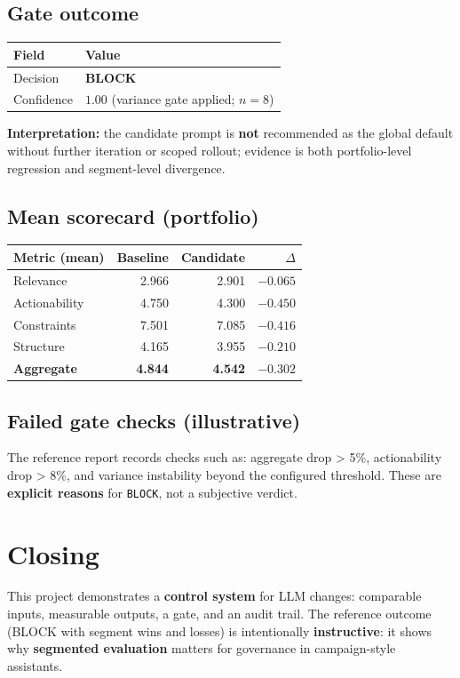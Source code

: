 \documentclass[11pt,a4paper]{article}
\begin{document}
\subsection{Gate outcome}

\begin{center}
\begin{tabular}{@{}ll@{}}
\toprule
\textbf{Field} & \textbf{Value} \\
\midrule
Decision & \textbf{BLOCK} \\
Confidence & $1.00$ (variance gate applied; $n = 8$) \\
\bottomrule
\end{tabular}
\end{center}

\textbf{Interpretation:} the candidate prompt is \textbf{not} recommended as the global default without further iteration or scoped rollout; evidence is both portfolio-level regression and segment-level divergence.

\subsection{Mean scorecard (portfolio)}

\begin{center}
\begin{tabular}{@{}lrrr@{}}
\toprule
\textbf{Metric (mean)} & \textbf{Baseline} & \textbf{Candidate} & \textbf{$\Delta$} \\
\midrule
Relevance & 2.966 & 2.901 & $-0.065$ \\
Actionability & 4.750 & 4.300 & $-0.450$ \\
Constraints & 7.501 & 7.085 & $-0.416$ \\
Structure & 4.165 & 3.955 & $-0.210$ \\
\textbf{Aggregate} & \textbf{4.844} & \textbf{4.542} & \textbf{$-0.302$} \\
\bottomrule
\end{tabular}
\end{center}

\subsection{Failed gate checks (illustrative)}

The reference report records checks such as: aggregate drop \textgreater{} 5\%, actionability drop \textgreater{} 8\%, and variance instability beyond the configured threshold. These are \textbf{explicit reasons} for \texttt{BLOCK}, not a subjective verdict.

\section{Closing}

This project demonstrates a \textbf{control system} for LLM changes: comparable inputs, measurable outputs, a gate, and an audit trail. The reference outcome (BLOCK with segment wins and losses) is intentionally \textbf{instructive}: it shows why \textbf{segmented evaluation} matters for governance in campaign-style assistants.
\end{document}
